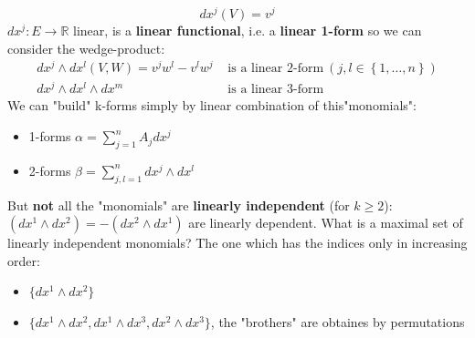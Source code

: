 \documentclass[../main.tex]{subfiles}
\begin{document}
\[
dx^j(V)=v^j
\]
$dx^j:E\to\mathbb{R}$ linear, is a \textbf{linear functional}, i.e. a \textbf{linear 1-form} so we can consider the wedge-product:
\[
\begin{split}
dx^j\wedge dx^l(V,W)=v^j w^l-v^l w^j &\text{ is a linear 2-form} \ \left(j,l\in\left\{1,\dots,n\right\}\right)\\
dx^j\wedge dx^l\wedge dx^m \qquad\qquad\qquad \ \ &\text{ is a linear 3-form}
\end{split}
\]
We can "build" k-forms simply by linear combination of this"monomials":
\begin{itemize}
    \item 1-forms $\alpha=\sum_{j=1}^n A_j dx^j$
    \item 2-forms $\beta=\sum_{j,l=1}^n dx^j\wedge dx^l$
\end{itemize}
{\selectfont{}\relax} But \textbf{not} all the "monomials" are \textbf{linearly independent} (for $k\ge2$): $(dx^1\wedge dx^2)=-(dx^2\wedge dx^1)$ are linearly dependent. What is a maximal set of linearly independent monomials? The one which has the indices only in increasing order:
\begin{itemize}
    \item $\{dx^1\wedge dx^2\}$
    \item $\{dx^1\wedge dx^2, dx^1\wedge dx^3, dx^2\wedge dx^3\}$, the "brothers" are obtaines by permutations
\end{itemize}
\end{document}

